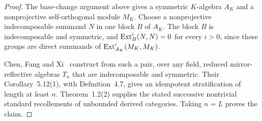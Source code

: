 \begin{proof}
The base-change argument above gives a symmetric $K$-algebra $A_K$ and a
nonprojective self-orthogonal module $M_K$. Choose a nonprojective
indecomposable summand $N$ in one block $B$ of $A_K$. The block $B$ is
indecomposable and symmetric, and $\operatorname{Ext}_B^i(N,N)=0$ for every $i>0$,
since these groups are direct summands of $\operatorname{Ext}_{A_K}^i(M_K,M_K)$.

Chen, Fang and Xi~\cite[proof of Theorem~5.13]{ChenFangXi2024} construct
from such a pair, over any field, reduced mirror-reflective algebras $T_n$
that are indecomposable and symmetric. Their Corollary~5.12(1), with
Definition~4.7, gives an idempotent stratification of length at least
$n$. Theorem~1.2(2) supplies the
stated successive nontrivial standard recollements of unbounded derived
categories. Taking $n=L$ proves the claim.
\end{proof}
